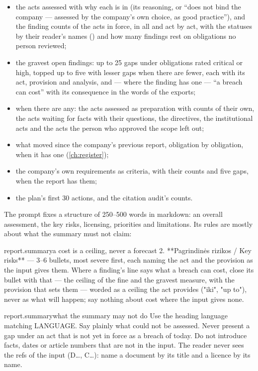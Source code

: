\begin{itemize}
  \item the acts assessed with why each is in (its reasoning, or \enquote{does not bind the
    company --- assessed by the company's own choice, as good practice}), and the finding counts
    of the acts in force, in all and act by act, with the statuses by their reader's names
    () and how many findings rest on obligations no person reviewed;
  \item the gravest open findings: up to 25 gaps under obligations rated critical or high, topped
    up to five with lesser gaps when there are fewer, each with its act, provision and analysis,
    and --- where the finding has one --- \enquote{a breach can cost} with its consequence in the
    words of the exports;
  \item when there are any: the acts assessed as preparation with counts of their own, the acts
    waiting for facts with their questions, the directives, the institutional acts and the acts
    the person who approved the scope left out;
  \item what moved since the company's previous report, obligation by obligation, when it has
    one (\cref{ch:register});
  \item the company's own requirements as criteria, with their counts and five gaps, when the
    report has them;
  \item the plan's first 30 actions, and the citation audit's counts.
\end{itemize}

The prompt fixes a structure of 250--500 words in markdown: an overall assessment, the key
risks, licensing, priorities and limitations. Its rules are mostly about what the summary must
not claim:

\begin{promptexcerpt}{report.summary}{a cost is a ceiling, never a forecast}
  2. **Pagrindinės rizikos / Key risks** — 3–6 bullets, most severe first, each naming
     the act and the provision as the input gives them. Where a finding's line says
     what a breach can cost, close its bullet with that — the ceiling of the fine and
     the gravest measure, with the provision that sets them — worded as a ceiling the
     act provides ("iki", "up to"), never as what will happen; say nothing about cost
     where the input gives none.
\end{promptexcerpt}

\begin{promptexcerpt}{report.summary}{what the summary may not do}
  Use the heading language matching {LANGUAGE}. Say plainly what could not be
  assessed. Never present a gap under an act that is not yet in force as a breach of
  today. Do not introduce facts, dates or article numbers that are not in the input.
  The reader never sees the refs of the input (D…, C…): name a document by its title
  and a licence by its name.
\end{promptexcerpt}

